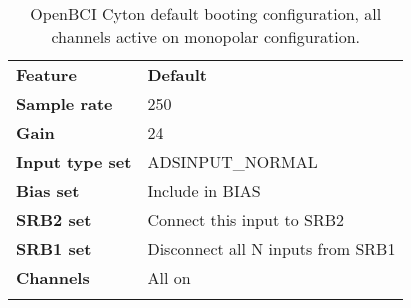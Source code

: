 
\begin{table}
\begin{centering}
\begin{tabular}{>{\raggedright}p{2.5cm}>{\raggedright}p{4.5cm}}
\toprule 
\addlinespace[1em]
\textbf{Feature} & \textbf{Default}\tabularnewline\addlinespace[1em]
\midrule
\addlinespace[1em]
\textbf{Sample rate} & 250\tabularnewline
\addlinespace[0.5cm]
\textbf{Gain} & 24\tabularnewline
\addlinespace[0.5cm]
\textbf{Input type set} & ADSINPUT\_NORMAL\tabularnewline
\addlinespace[0.5cm]
\textbf{Bias set} & Include in BIAS\tabularnewline
\addlinespace[0.5cm]
\textbf{SRB2 set} & Connect this input to SRB2\tabularnewline
\addlinespace[0.5cm]
\textbf{SRB1 set} & Disconnect all N inputs from SRB1\tabularnewline
\addlinespace[0.5cm]
\textbf{Channels } & All on\tabularnewline
\bottomrule
\addlinespace[0.5cm]
\end{tabular}
\par\end{centering}
\caption[OpenBCI Cyton default booting configuration.]{OpenBCI Cyton default booting configuration, all channels active on monopolar configuration.}\label{table:openbci_default}
\end{table}


